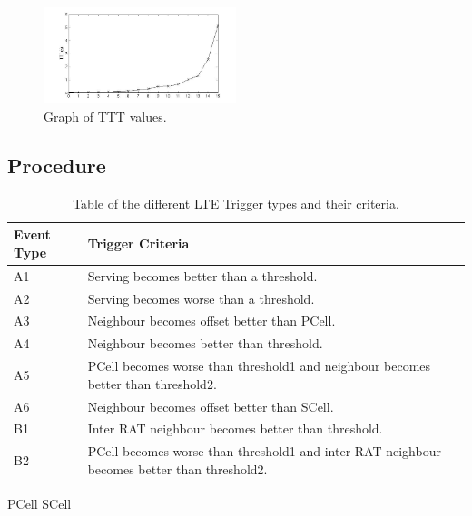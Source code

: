 \begin{figure}[H]
  \begin{center}
    	  \includegraphics[width=0.5\textwidth]{figures/TTTgraph.jpg}
    \end{center}
    \caption{Graph of TTT values.}
    \label{fig:ttt}
\end{figure}
\subsection{Procedure}\label{procedure}
\begin{table}[H]
  \begin{center}
    \begin{tabular}{| l | p{11.1cm} |}
  	  \hline
      Event Type & Trigger Criteria \\ \hline
      A1 & Serving becomes better than a threshold. \\
      A2 & Serving becomes worse than a threshold. \\
      A3 & Neighbour becomes offset better than PCell. \\
      A4 & Neighbour becomes better than threshold. \\
      A5 & PCell becomes worse than threshold1 and neighbour becomes better than threshold2. \\
      A6 & Neighbour becomes offset better than SCell. \\
      B1 & Inter RAT neighbour becomes better than threshold. \\
      B2 & PCell becomes worse than threshold1 and inter RAT neighbour becomes better than threshold2. \\
      \hline
  	\end{tabular}
  \end{center}
  \caption{Table of the different LTE Trigger types and their criteria.}
  \label{tab:trigger}
\end{table}
\ac{PCell} \ac{SCell}

~\cite{3gpp2012triggers}
~\cite{cox2012introduction}